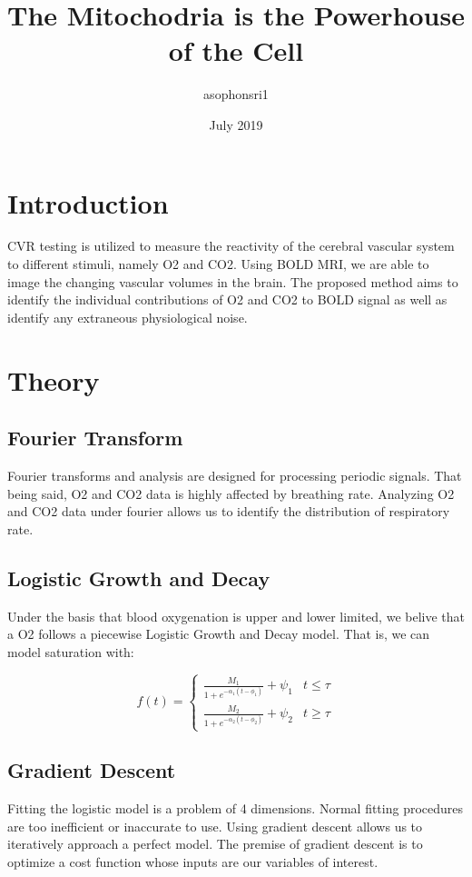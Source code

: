 \documentclass{article}
\title{The Mitochodria is the Powerhouse of the Cell}
\author{asophonsri1 }
\date{July 2019}
\begin{document}
\maketitle

\section*{Introduction}
  CVR testing is utilized to measure the reactivity of the cerebral vascular system to different stimuli, namely O2 and CO2. Using BOLD MRI, we are able to image the changing vascular volumes in the brain. The proposed method aims to identify the individual contributions of O2 and CO2 to BOLD signal as well as identify any extraneous physiological noise.

\section*{Theory}
\subsection*{Fourier Transform}
  Fourier transforms and analysis are designed for processing periodic signals. That being said, O2 and CO2 data is highly affected by breathing rate. Analyzing O2 and CO2 data under fourier allows us to identify the distribution of respiratory rate.
\subsection*{Logistic Growth and Decay}
  Under the basis that blood oxygenation is upper and lower limited, we belive that a O2 follows a piecewise Logistic Growth and Decay model. That is, we can model saturation with:

\begin{equation}
f(t)=\begin{cases}
    \frac{M_1}{1+e^{-\alpha_1(t-\phi_1)}}  + \psi_1 & t\leq \tau\\[.4em]
    \frac{M_2}{1+e^{-\alpha_2(t-\phi_2)}}  + \psi_2 & t\geq \tau
 \end{cases}
\end{equation}



\subsection*{Gradient Descent}
Fitting the logistic model is a problem of 4 dimensions. Normal fitting procedures are too inefficient or inaccurate to use. Using gradient descent allows us to iteratively approach a perfect model. The premise of gradient descent is to optimize a cost function whose inputs are our variables of interest.\\
\end{document}
